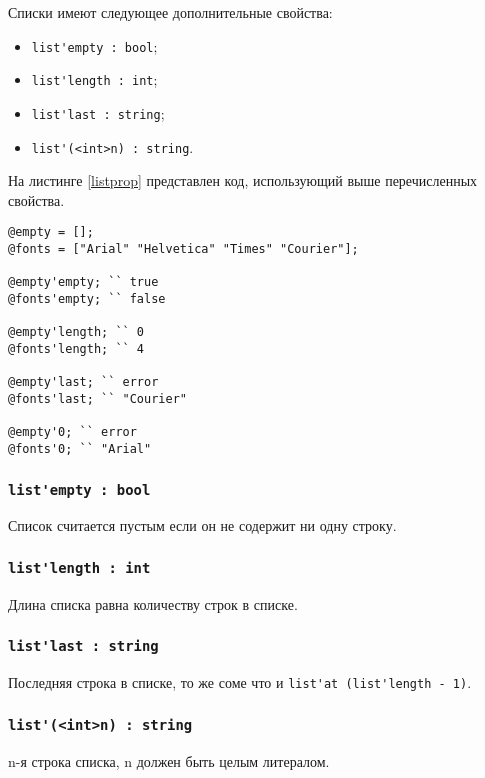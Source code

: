 \documentclass[a4paper, 14pt]{extarticle}
\newenvironment{icItems}
	{ \begin{itemize} [noitemsep,nolistsep] }
	{ \end{itemize} }
\begin{document}
Списки имеют следующее дополнительные свойства:
\begin{icItems}
\item
	\lstinline|list'empty : bool|;
\item
	\lstinline|list'length : int|;
\item
	\lstinline|list'last : string|;
\item
	\lstinline|list'(<int>n) : string|.
\end{icItems}

На листинге \ref{listprop} представлен код, использующий выше перечисленных свойства.

\begin{lstlisting}[caption=Свойства класса list, label=listprop]
@empty = [];
@fonts = ["Arial" "Helvetica" "Times" "Courier"];

@empty'empty; `` true
@fonts'empty; `` false

@empty'length; `` 0
@fonts'length; `` 4

@empty'last; `` error
@fonts'last; `` "Courier"

@empty'0; `` error
@fonts'0; `` "Arial"
\end{lstlisting}

\subsubsection{\lstinline|list'empty : bool|}

Список считается пустым если он не содержит ни одну строку.

\subsubsection{\lstinline|list'length : int|}

Длина списка равна количеству строк в списке.

\subsubsection{\lstinline|list'last : string|}

Последняя строка в списке, то же соме что и \lstinline|list'at (list'length - 1)|.

\subsubsection{\lstinline|list'(<int>n) : string|}

n-я строка списка, n должен быть целым литералом.
\end{document}

